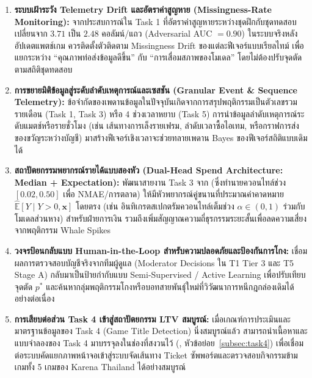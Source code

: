 \begin{enumerate}
  \item \textbf{ระบบเฝ้าระวัง Telemetry Drift และอัตราค่าสูญหาย (Missingness-Rate Monitoring):}
  จากประสบการณ์ใน Task 1 ที่อัตราค่าสูญหายระหว่างชุดฝึกกับชุดทดสอบเปลี่ยนจาก $3.71$ เป็น $2.48$ คอลัมน์/แถว (Adversarial AUC $= 0.90$) ในระบบจริงหลังอัปเดตแพตช์เกม ควรติดตั้งตัวติดตาม Missingness Drift ของแต่ละฟีเจอร์แบบเรียลไทม์ เพื่อแยกระหว่าง ``คุณภาพท่อส่งข้อมูลดีขึ้น'' กับ ``การเสื่อมสภาพของโมเดล'' โดยไม่ต้องปรับจุดตัดตามสถิติชุดทดสอบ

  \item \textbf{การขยายมิติข้อมูลสู่ระดับลำดับเหตุการณ์และเซสชัน (Granular Event \& Sequence Telemetry):}
  ข้อจำกัดของเพดานข้อมูลในปัจจุบันเกิดจากการสรุปพฤติกรรมเป็นตัวเลขรวมรายเดือน (Task 1, Task 3) หรือ 4 ช่วงเวลาหยาบ (Task 5) การนำข้อมูลลำดับเหตุการณ์ระดับแมตช์หรือรายชั่วโมง (เช่น เส้นทางการเล็งรายเฟรม, ลำดับเวลาซื้อไอเทม, หรือกราฟการส่งของขวัญระหว่างบัญชี) มาสร้างฟีเจอร์เชิงเวลาจะช่วยทลายเพดาน Bayes ของฟีเจอร์สถิติแบบเดิมได้

  \item \textbf{สถาปัตยกรรมพยากรณ์รายได้แบบสองหัว (Dual-Head Spend Architecture: Median + Expectation):}
  พัฒนาสายงาน Task 3 จาก  (ซึ่งทำนายควอนไทล์ช่วง $[0.02, 0.50]$ เพื่อ NMAE/การตลาด) ให้มีหัวพยากรณ์คู่ขนานที่ประมาณค่าคาดหมาย $\widehat{\mathbb{E}}[Y \mid Y>0, \mathbf{x}]$ โดยตรง (เช่น อินทิเกรตสเปกตรัมควอนไทล์เต็มช่วง $\alpha \in (0, 1)$ ร่วมกับโมเดลส่วนหาง) สำหรับฝ่ายการเงิน รวมถึงเพิ่มสัญญาณความถี่ธุรกรรมระยะสั้นเพื่อลดความเสี่ยงจากพฤติกรรม Whale Spikes

  \item \textbf{วงจรป้อนกลับแบบ Human-in-the-Loop สำหรับความปลอดภัยและป้องกันการโกง:}
  เชื่อมผลการตรวจสอบบัญชีจริงจากทีมผู้ดูแล (Moderator Decisions ใน T1 Tier 3 และ T5 Stage A) กลับมาเป็นป้ายกำกับแบบ Semi-Supervised / Active Learning เพื่อปรับเทียบจุดตัด $p^*$ และค้นหากลุ่มพฤติกรรมโกงหรือบอทสายพันธุ์ใหม่ที่วิวัฒนาการหนีกฎกล่องเดิมได้อย่างต่อเนื่อง

  \item \textbf{การเสียบต่อส่วน Task 4 เข้าสู่สถาปัตยกรรม LTV สมบูรณ์:}
  เมื่อเกณฑ์การประเมินและมาตรฐานข้อมูลของ Task 4 (Game Title Detection) นิ่งสมบูรณ์แล้ว สามารถนำเนื้อหาและแบบจำลองของ Task 4 มาบรรจุลงในช่องที่สงวนไว้ (, หัวข้อย่อย~\ref{subsec:task4}) เพื่อเชื่อมต่อระบบคัดแยกภาพหน้าจอเข้าสู่ระบบจัดเส้นทาง Ticket ซัพพอร์ตและตรวจสอบกิจกรรมข้ามเกมทั้ง 5 เกมของ Karena Thailand ได้อย่างสมบูรณ์
\end{enumerate}
